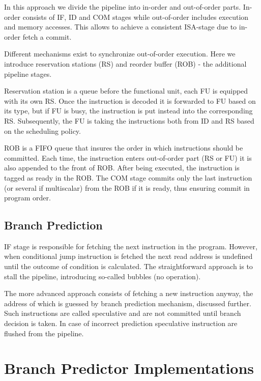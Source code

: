 In this approach we divide the pipeline into in-order and out-of-order parts. In-order consists of IF, ID and COM stages while out-of-order includes execution and memory accesses. This allows to achieve a consistent ISA-stage due to in-order fetch a commit. 

Different mechanisms exist to synchronize out-of-order execution. Here we introduce reservation stations (RS) and reorder buffer (ROB) - the additional pipeline stages.

Reservation station is a queue before the functional unit, each FU is equipped with its own RS. Once the instruction is decoded it is forwarded to FU based on its type, but if FU is busy, the instruction is put instead into the corresponding RS. Subsequently, the FU is taking the instructions both from ID and RS based on the scheduling policy.

ROB is a FIFO queue that insures the order in which instructions should be committed. Each time, the instruction enters out-of-order part (RS or FU) it is also appended to the front of ROB. After being executed, the instruction is tagged as ready in the ROB. The COM stage commits only the last instruction (or several if multiscalar) from the ROB if it is ready, thus ensuring commit in program order.


\subsection{Branch Prediction}

IF stage is responsible for fetching the next instruction in the program. However, when conditional jump instruction is fetched the next read address is undefined until the outcome of condition is calculated. The straightforward approach is to stall the pipeline, introducing so-called bubbles (no operation).

The more advanced approach consists of fetching a new instruction anyway, the address of which is guessed by branch prediction mechanism, discussed further. Such instructions are called speculative and are not committed until branch decision is taken. In case of incorrect prediction speculative instruction are flushed from the pipeline. 

\section{Branch Predictor Implementations}

